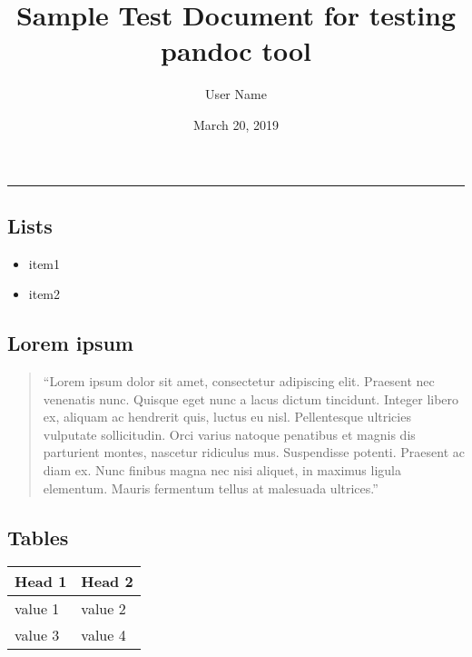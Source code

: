 \documentclass[]{article}
\title{Sample Test Document for testing pandoc tool}
\author{User Name}
\date{March 20, 2019}
\providecommand{\tightlist}{%
  \setlength{\itemsep}{0pt}\setlength{\parskip}{0pt}}
\begin{document}
\maketitle

\begin{center}\rule{0.5\linewidth}{\linethickness}\end{center}

\hypertarget{lists}{%
\subsection{Lists}\label{lists}}

\begin{itemize}
\tightlist
\item
  item1
\item
  item2
\end{itemize}

\hypertarget{lorem-ipsum}{%
\subsection{Lorem ipsum}\label{lorem-ipsum}}

\begin{quote}
``Lorem ipsum dolor sit amet, consectetur adipiscing elit. Praesent nec
venenatis nunc. Quisque eget nunc a lacus dictum tincidunt. Integer
libero ex, aliquam ac hendrerit quis, luctus eu nisl. Pellentesque
ultricies vulputate sollicitudin. Orci varius natoque penatibus et
magnis dis parturient montes, nascetur ridiculus mus. Suspendisse
potenti. Praesent ac diam ex. Nunc finibus magna nec nisi aliquet, in
maximus ligula elementum. Mauris fermentum tellus at malesuada
ultrices.''
\end{quote}

\hypertarget{tables}{%
\subsection{Tables}\label{tables}}

\begin{longtable}[]{@{}ll@{}}
\toprule
Head 1 & Head 2\tabularnewline
\midrule
\endhead
value 1 & value 2\tabularnewline
value 3 & value 4\tabularnewline
\bottomrule
\end{longtable}
\end{document}
